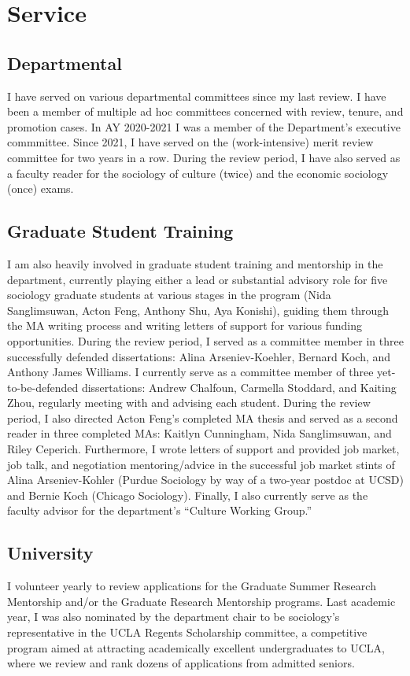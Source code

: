 \documentclass[a4paper,11pt]{extarticle}
\begin{document}
\section*{Service}
\subsection*{Departmental}
I have served on various departmental committees since my last review. I have been a member of multiple ad hoc committees concerned with review, tenure, and promotion cases. In AY 2020-2021 I was a member of the Department's executive commmittee. Since 2021, I have served on the (work-intensive) merit review committee for two years in a row. During the review period, I have also served as a faculty reader for the sociology of culture (twice) and the economic sociology (once) exams. 

\subsection*{Graduate Student Training}
I am also heavily involved in graduate student training and mentorship in the department, currently playing either a lead or substantial advisory role for five sociology graduate students at various stages in the program (Nida Sanglimsuwan, Acton Feng, Anthony Shu, Aya Konishi), guiding them through the MA writing process and writing letters of support for various funding opportunities. During the review period, I served as a committee member in three successfully defended dissertations: Alina Arseniev-Koehler, Bernard Koch, and Anthony James Williams. I currently serve as a committee member of three yet-to-be-defended dissertations: Andrew Chalfoun, Carmella Stoddard, and Kaiting Zhou, regularly meeting with and advising each student. During the review period, I also directed Acton Feng's completed MA thesis and served as a second reader in three completed MAs: Kaitlyn Cunningham, Nida Sanglimsuwan, and Riley Ceperich. Furthermore, I wrote letters of support and provided job market, job talk, and negotiation mentoring/advice in the successful job market stints of Alina Arseniev-Kohler (Purdue Sociology by way of a two-year postdoc at UCSD) and Bernie Koch (Chicago Sociology). Finally, I also currently serve as the faculty advisor for the department's ``Culture Working Group.'' 

\subsection*{University}
I volunteer yearly to review applications for the Graduate Summer Research Mentorship and/or the Graduate Research Mentorship programs. Last academic year, I was also nominated by the department chair to be sociology's representative in the UCLA Regents Scholarship committee, a competitive program aimed at attracting academically excellent undergraduates to UCLA, where we review and rank dozens of applications from admitted seniors.
\end{document}
